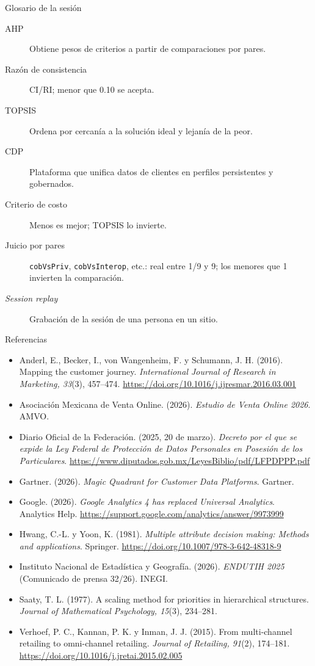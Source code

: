 \documentclass[aspectratio=169,xcolor=dvipsnames]{beamer}
\begin{document}
\begin{frame}{Glosario de la sesión}
\scriptsize
\begin{description}
  \item[AHP] Obtiene pesos de criterios a partir de comparaciones por pares.
  \item[Razón de consistencia] CI/RI; menor que 0.10 se acepta.
  \item[TOPSIS] Ordena por cercanía a la solución ideal y lejanía de la peor.
  \item[CDP] Plataforma que unifica datos de clientes en perfiles persistentes y gobernados.
  \item[Criterio de costo] Menos es mejor; TOPSIS lo invierte.
  \item[Juicio por pares] \texttt{cobVsPriv}, \texttt{cobVsInterop}, etc.: real entre 1/9 y 9; los menores que 1 invierten la comparación.
  \item[\textit{Session replay}] Grabación de la sesión de una persona en un sitio.
\end{description}
\end{frame}

\begin{frame}{Referencias}
\tiny
\begin{itemize}
  \item[] Anderl, E., Becker, I., von Wangenheim, F. y Schumann, J. H. (2016). Mapping the customer journey. \textit{International Journal of Research in Marketing, 33}(3), 457--474. \url{https://doi.org/10.1016/j.ijresmar.2016.03.001}
  \item[] Asociación Mexicana de Venta Online. (2026). \textit{Estudio de Venta Online 2026}. AMVO.
  \item[] Diario Oficial de la Federación. (2025, 20 de marzo). \textit{Decreto por el que se expide la Ley Federal de Protección de Datos Personales en Posesión de los Particulares}. \url{https://www.diputados.gob.mx/LeyesBiblio/pdf/LFPDPPP.pdf}
  \item[] Gartner. (2026). \textit{Magic Quadrant for Customer Data Platforms}. Gartner.
  \item[] Google. (2026). \textit{Google Analytics 4 has replaced Universal Analytics}. Analytics Help. \url{https://support.google.com/analytics/answer/9973999}
  \item[] Hwang, C.-L. y Yoon, K. (1981). \textit{Multiple attribute decision making: Methods and applications}. Springer. \url{https://doi.org/10.1007/978-3-642-48318-9}
  \item[] Instituto Nacional de Estadística y Geografía. (2026). \textit{ENDUTIH 2025} (Comunicado de prensa 32/26). INEGI.
  \item[] Saaty, T. L. (1977). A scaling method for priorities in hierarchical structures. \textit{Journal of Mathematical Psychology, 15}(3), 234--281.
  \item[] Verhoef, P. C., Kannan, P. K. y Inman, J. J. (2015). From multi-channel retailing to omni-channel retailing. \textit{Journal of Retailing, 91}(2), 174--181. \url{https://doi.org/10.1016/j.jretai.2015.02.005}
\end{itemize}
\end{frame}
\end{document}
